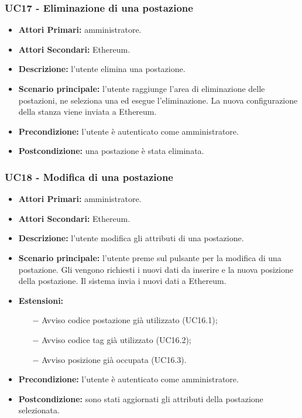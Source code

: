 \subsubsection{UC17 - Eliminazione di una postazione}
\begin{itemize}
	\item\textbf{Attori Primari:}
	amministratore.
	\item\textbf{Attori Secondari:}
	Ethereum.
	\item\textbf{Descrizione:}
	l'utente elimina una postazione.
	\item\textbf{Scenario principale:} 
	l'utente raggiunge l'area di eliminazione delle postazioni, ne seleziona una ed esegue l'eliminazione. La nuova configurazione della stanza viene inviata a Ethereum.
	\item\textbf{Precondizione:} 
	l'utente è autenticato come amministratore.
	\item\textbf{Postcondizione:}
	una postazione è stata eliminata.
\end{itemize}

\subsubsection{ UC18 - Modifica di una postazione}
\begin{itemize}
	\item\textbf{Attori Primari:}
	amministratore.
	\item\textbf{Attori Secondari:}
	Ethereum.
	\item\textbf{Descrizione:}
	l'utente modifica gli attributi di una postazione.
	\item\textbf{Scenario principale:} 
	l'utente preme sul pulsante per la modifica di una postazione. Gli vengono richiesti i nuovi dati da inserire e la nuova posizione della postazione. Il sistema invia i nuovi dati a Ethereum.
	\item\textbf{Estensioni:}
	\begin{itemize}
		\item[$-$] Avviso codice postazione già utilizzato (UC16.1);
		\item[$-$] Avviso codice tag già utilizzato (UC16.2);
		\item[$-$] Avviso posizione già occupata (UC16.3).
	\end{itemize}
	\item\textbf{Precondizione:} 
	l'utente è autenticato come amministratore.
	\item\textbf{Postcondizione:}
	sono stati aggiornati gli attributi della postazione selezionata.
\end{itemize}


